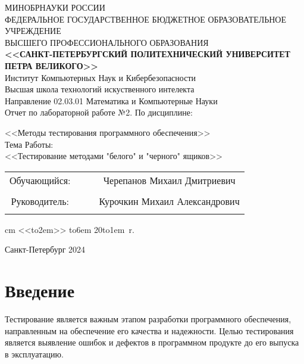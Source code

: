 \documentclass[12pt]{article}
\begin{document}
\begin{center}
\hfill \break
\large{МИНОБРНАУКИ РОССИИ} \\
\hfill \break
\small {ФЕДЕРАЛЬНОЕ ГОСУДАРСТВЕННОЕ БЮДЖЕТНОЕ ОБРАЗОВАТЕЛЬНОЕ УЧРЕЖДЕНИЕ }\\
\small { ВЫСШЕГО ПРОФЕССИОНАЛЬНОГО ОБРАЗОВАНИЯ  } \\
\hfill \break
\normalsize {\textbf{ <<САНКТ-ПЕТЕРБУРГСКИЙ ПОЛИТЕХНИЧЕСКИЙ УНИВЕРСИТЕТ } }\\
{\normalsize {\textbf { ПЕТРА ВЕЛИКОГО>>}}} \\
\hfill \break
\large{Институт Компьютерных Наук и Кибербезопасности }\\
\hfill \break
\large{ Высшая школа технологий искуственного интелекта }\\
\hfill \break
Направление 02.03.01 Математика и Компьютерные Науки\\
\vskip 1cm
\large {Отчет по лабораторной работе №2.}
\vskip 0.2cm
\large {По дисциплине:}

\large{<<Методы тестирования программного обеспечения>>} \\
\hfill \break
\normalsize{Тема Работы:} \\
\hfill \break
\normalsize{<<Тестирование методами "белого" и "черного" ящиков>>} \\
\thispagestyle {empty}

\hfill \break
\vskip 0.3cm
\vskip 1cm
\end{center}
\begin {tabular}{cccc}
\hspace{0.5cm}Обучающийся: &\underline {\hspace{3cm}} &  &Черепанов Михаил Дмитриевич\\\\
\hspace{0.5cm}Руководитель: &\underline {\hspace{3cm}} & &Курочкин Михаил Александрович\\\\
\end{tabular}
 cm
\hspace{9cm}\def \hrf#1{\hbox to#1{\hrulefill}}<<\hrf{2em}>>  \hrf{6em}  20\hrf{1em}~r.
\vskip 2cm
\begin {center} Санкт-Петербург 2024 \end{center}
\newpage
\tableofcontents
\newpage






\section*{Введение}
Тестирование является важным этапом разработки программного обеспечения, направленным на обеспечение его качества и надежности. Целью тестирования является выявление ошибок и дефектов в программном продукте до его выпуска в эксплуатацию.
\end{document}
